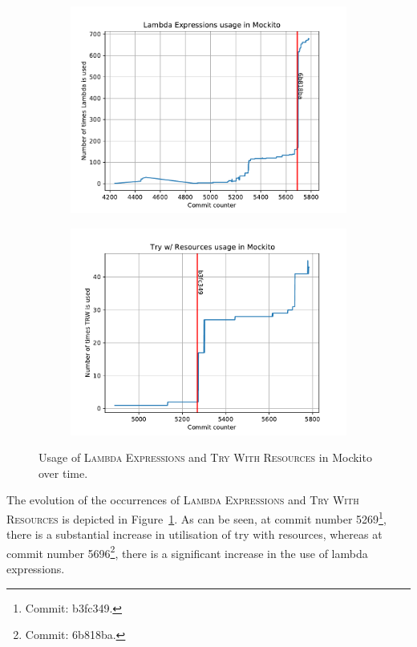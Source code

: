 \begin{figure}[b]
\begin{subfigure}{.5\columnwidth}
  \centering
  \includegraphics[width=1.\linewidth]{papers/jfeature/img/lambda_count.pdf}
\end{subfigure}%
\begin{subfigure}{.5\columnwidth}
  \centering
  \includegraphics[width=1.\linewidth]{papers/jfeature/img/TWR_count.pdf}
\end{subfigure}%
\caption{\label{lbl:mockito} Usage of \textsc{Lambda Expressions} and \textsc{Try With Resources} in Mockito over time.}
\end{figure}
The evolution of the occurrences of \textsc{Lambda Expressions} and \textsc{Try With Resources} is depicted in Figure~\ref{lbl:mockito}. As can be seen, at commit number 5269\footnote{Commit: b3fc349.}, there is a substantial increase in utilisation of try with resources, whereas at commit number 5696\footnote{Commit: 6b818ba.}, there is a significant increase in the use of lambda expressions.

